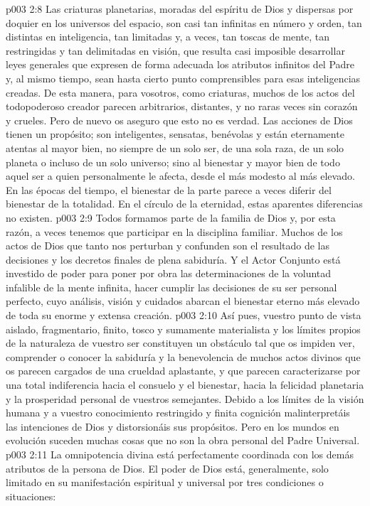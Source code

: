 \vs p003 2:8 Las criaturas planetarias, moradas del espíritu de Dios y dispersas por doquier en los universos del espacio, son casi tan infinitas en número y orden, tan distintas en inteligencia, tan limitadas y, a veces, tan toscas de mente, tan restringidas y tan delimitadas en visión, que resulta casi imposible desarrollar leyes generales que expresen de forma adecuada los atributos infinitos del Padre y, al mismo tiempo, sean hasta cierto punto comprensibles para esas inteligencias creadas. De esta manera, para vosotros, como criaturas, muchos de los actos del todopoderoso creador parecen arbitrarios, distantes, y no raras veces sin corazón y crueles. Pero de nuevo os aseguro que esto no es verdad. Las acciones de Dios tienen un propósito; son inteligentes, sensatas, benévolas y están eternamente atentas al mayor bien, no siempre de un solo ser, de una sola raza, de un solo planeta o incluso de un solo universo; sino al bienestar y mayor bien de todo aquel ser a quien personalmente le afecta, desde el más modesto al más elevado. En las épocas del tiempo, el bienestar de la parte parece a veces diferir del bienestar de la totalidad. En el círculo de la eternidad, estas aparentes diferencias no existen.
\vs p003 2:9 Todos formamos parte de la familia de Dios y, por esta razón, a veces tenemos que participar en la disciplina familiar. Muchos de los actos de Dios que tanto nos perturban y confunden son el resultado de las decisiones y los decretos finales de plena sabiduría. Y el Actor Conjunto está investido de poder para poner por obra las determinaciones de la voluntad infalible de la mente infinita, hacer cumplir las decisiones de su ser personal perfecto, cuyo análisis, visión y cuidados abarcan el bienestar eterno más elevado de toda su enorme y extensa creación.
\vs p003 2:10 Así pues, vuestro punto de vista aislado, fragmentario, finito, tosco y sumamente materialista y los límites propios de la naturaleza de vuestro ser constituyen un obstáculo tal que os impiden ver, comprender o conocer la sabiduría y la benevolencia de muchos actos divinos que os parecen cargados de una crueldad aplastante, y que parecen caracterizarse por una total indiferencia hacia el consuelo y el bienestar, hacia la felicidad planetaria y la prosperidad personal de vuestros semejantes. Debido a los límites de la visión humana y a vuestro conocimiento restringido y finita cognición malinterpretáis las intenciones de Dios y distorsionáis sus propósitos. Pero en los mundos en evolución suceden muchas cosas que no son la obra personal del Padre Universal.
\vs p003 2:11 \pc La omnipotencia divina está perfectamente coordinada con los demás atributos de la persona de Dios. El poder de Dios está, generalmente, solo limitado en su manifestación espiritual y universal por tres condiciones o situaciones:
